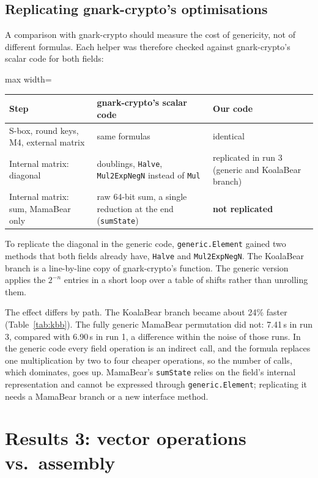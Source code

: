 \documentclass[10pt,a4paper]{article}
\begin{document}
\subsection{Replicating gnark-crypto's optimisations}\label{sec:replicate}

A comparison with gnark-crypto should measure the cost of genericity, not of different
formulas. Each helper was therefore checked against gnark-crypto's scalar code for both
fields:
\begin{center}\small
\begin{adjustbox}{max width=\linewidth}
\begin{tabular}{lll}
\toprule
Step & gnark-crypto's scalar code & Our code \\ \midrule
S-box, round keys, M4, external matrix & same formulas & identical \\
Internal matrix: diagonal & doublings, \texttt{Halve}, \texttt{Mul2ExpNegN} instead of \texttt{Mul} & replicated in run 3 (generic and KoalaBear branch) \\
Internal matrix: sum, MamaBear only & raw 64-bit sum, a single reduction at the end (\texttt{sumState}) & \textbf{not replicated} \\
\bottomrule
\end{tabular}
\end{adjustbox}
\end{center}
To replicate the diagonal in the generic code, \texttt{generic.Element} gained two methods
that both fields already have, \texttt{Halve} and \texttt{Mul2ExpNegN}. The KoalaBear branch
is a line-by-line copy of gnark-crypto's function. The generic version applies the
$2^{-n}$ entries in a short loop over a table of shifts rather than unrolling them.

The effect differs by path. The KoalaBear branch became about 24\% faster
(Table~\ref{tab:kbb}). The fully generic MamaBear permutation did not: 7.41\,\textmu s in
run 3, compared with 6.90\,\textmu s in run 1, a difference within the noise of those runs.
In the generic code every field operation is an indirect call, and the formula replaces one
multiplication by two to four cheaper operations, so the number of calls, which dominates,
goes up. MamaBear's \texttt{sumState} relies on the field's internal representation and
cannot be expressed through \texttt{generic.Element}; replicating it needs a MamaBear branch
or a new interface method.

\section{Results 3: vector operations vs.\ assembly}\label{sec:paths}
\end{document}

